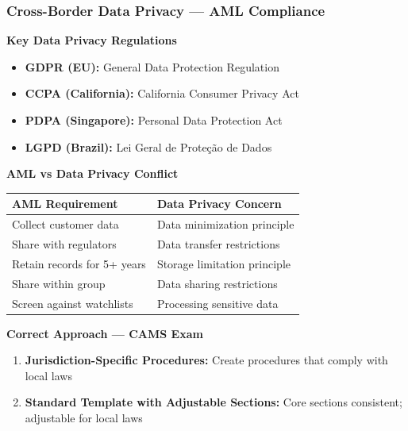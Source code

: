 \documentclass[12pt,aspectratio=169]{beamer}
\renewcommand{\scriptsize}{\fontsize{4.5}{5.5}\selectfont}
\newcommand{\keypoint}[1]{\textcolor{deepblue}{\textbf{#1}}}
\begin{document}
	\begin{frame}
		\frametitle{\fontsize{11}{13}\selectfont \textbf{Cross-Border Data Privacy — AML Compliance}}
		\begin{block}{\fontsize{7}{9}\selectfont \textbf{Key Data Privacy Regulations}}
			\scriptsize
			\begin{itemize}
				\item \textbf{GDPR (EU):} General Data Protection Regulation
				\item \textbf{CCPA (California):} California Consumer Privacy Act
				\item \textbf{PDPA (Singapore):} Personal Data Protection Act
				\item \textbf{LGPD (Brazil):} Lei Geral de Proteção de Dados
			\end{itemize}
		\end{block}
		\vspace{0.02cm}
		\begin{block}{\fontsize{7}{9}\selectfont \textbf{AML vs Data Privacy Conflict}}
			\scriptsize
			\begin{tabular}{|p{}|p{0.56\textwidth}|}
				\hline
				\keypoint{AML Requirement} & \keypoint{Data Privacy Concern} \\
				\hline
				Collect customer data & Data minimization principle \\
				\hline
				Share with regulators & Data transfer restrictions \\
				\hline
				Retain records for 5+ years & Storage limitation principle \\
				\hline
				Share within group & Data sharing restrictions \\
				\hline
				Screen against watchlists & Processing sensitive data \\
				\hline
			\end{tabular}
		\end{block}
		\vspace{0.02cm}
		\begin{block}{\fontsize{7}{9}\selectfont \textbf{Correct Approach — CAMS Exam}}
			\scriptsize
			\begin{enumerate}
				\item \textbf{Jurisdiction-Specific Procedures:} Create procedures that comply with local laws
				\item \textbf{Standard Template with Adjustable Sections:} Core sections consistent; adjustable for local laws

\end{enumerate}
\end{block}
\end{frame}
\end{document}
